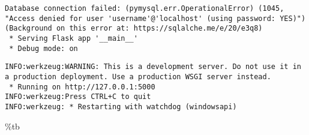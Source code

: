 \documentclass[
  letterpaper,
  DIV=11,
  numbers=noendperiod]{scrreprt}
\newenvironment{Shaded}{\begin{snugshade}}{\end{snugshade}}
\newcommand{\NormalTok}[1]{\textcolor[rgb]{0.00,0.23,0.31}{#1}}
\newcommand{\OperatorTok}[1]{\textcolor[rgb]{0.37,0.37,0.37}{#1}}
\begin{document}
\begin{verbatim}
Database connection failed: (pymysql.err.OperationalError) (1045, "Access denied for user 'username'@'localhost' (using password: YES)")
(Background on this error at: https://sqlalche.me/e/20/e3q8)
 * Serving Flask app '__main__'
 * Debug mode: on
\end{verbatim}

\begin{verbatim}
INFO:werkzeug:WARNING: This is a development server. Do not use it in a production deployment. Use a production WSGI server instead.
 * Running on http://127.0.0.1:5000
INFO:werkzeug:Press CTRL+C to quit
INFO:werkzeug: * Restarting with watchdog (windowsapi)
\end{verbatim}


\begin{Shaded}
\begin{Highlighting}[]
\OperatorTok{\%}\NormalTok{tb}
\end{Highlighting}
\end{Shaded}
\end{document}
